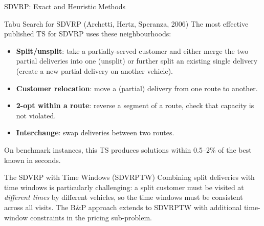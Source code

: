 \documentclass[aspectratio=169,10pt]{beamer}
\begin{document}
\begin{frame}[allowframebreaks]{SDVRP: Exact and Heuristic Methods}
\begin{block}{Tabu Search for SDVRP (Archetti, Hertz, Speranza, 2006)}
  The most effective published TS for SDVRP uses these neighbourhoods:
  \begin{itemize}
    \item \textbf{Split/unsplit}: take a partially-served customer and either
          merge the two partial deliveries into one (unsplit) or further split
          an existing single delivery (create a new partial delivery on another
          vehicle).
    \item \textbf{Customer relocation}: move a (partial) delivery from one
          route to another.
    \item \textbf{2-opt within a route}: reverse a segment of a route, check
          that capacity is not violated.
    \item \textbf{Interchange}: swap deliveries between two routes.
  \end{itemize}
  On benchmark instances, this TS produces solutions within 0.5--2\% of the
  best known in seconds.
\end{block}

\begin{block}{The SDVRP with Time Windows (SDVRPTW)}
  Combining split deliveries with time windows is particularly challenging:
  a split customer must be visited at \emph{different times} by different
  vehicles, so the time windows must be consistent across all visits.  The
  B\&P approach extends to SDVRPTW with additional time-window constraints
  in the pricing sub-problem.
\end{block}

\end{frame}
\end{document}
